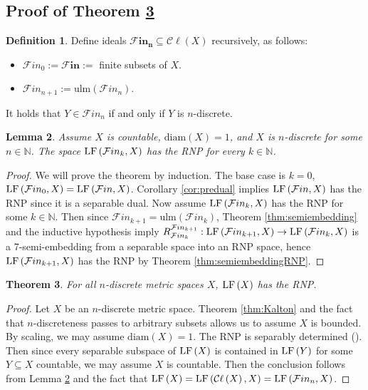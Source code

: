\documentclass[12pt]{amsart}
\newtheorem{theorem}{Theorem}[section]
\newtheorem{lemma}[theorem]{Lemma}
\theoremstyle{definition}
\newtheorem{definition}[theorem]{Definition}
\numberwithin{equation}{section}
\def \F {\mathcal{F}in}
\def \N {\mathbb{N}}
\def \sbs {\subseteq}
\newcommand{\Cl}[1]{\mathcal{C}\ell\left(#1\right)}
\newcommand{\diam}[1]{\mathrm{diam}\left( #1 \right)}
\newcommand{\ulm}[1]{\mathrm{ulm}\left(#1\right)}
\begin{document}
\subsection{Proof of Theorem \ref{thm:RNP}}
\begin{definition}
Define ideals $\boldsymbol{\F_n} \sbs \Cl{X}$ recursively, as follows:
\begin{itemize}
\item $\F_0 := \boldsymbol{\F} :=$ finite subsets of $X$.
\item $\F_{n+1} := \ulm{\F_n}$.
\end{itemize}
\end{definition}

It holds that $Y \in \F_n$ if and only if $Y$ is $n$-discrete.

\begin{lemma} \label{lem:RNP}
Assume $X$ is countable, $\diam{X} = 1$, and $X$ is $n$-discrete for some $n \in \N$. The space $\LF{\F_k}{X}$ has the RNP for every $k \in \N$.
\end{lemma}

\begin{proof}
We will prove the theorem by induction. The base case is $k=0$, $\LF{\F_0}{X} = \LF{\F}{X}$. Corollary \ref{cor:predual} implies $\LF{\F}{X}$ has the RNP since it is a separable dual. Now assume $\LF{\F_k}{X}$ has the RNP for some $k \in \N$. Then since $\F_{k+1} = \ulm{\F_k}$, Theorem \ref{thm:semiembedding} and the inductive hypothesis imply $R^{\F_{k+1}}_{\F_k}: \LF{\F_{k+1}}{X} \to \LF{\F_k}{X}$ is a 7-semi-embedding from a separable space into an RNP space, hence $\LF{\F_{k+1}}{X}$ has the RNP by Theorem \ref{thm:semiembeddingRNP}.
\end{proof}

\begin{theorem} \label{thm:RNP}
For all $n$-discrete metric spaces $X$, $\LF{X}$ has the RNP.
\end{theorem}

\begin{proof}
Let $X$ be an $n$-discrete metric space. Theorem \ref{thm:Kalton} and the fact that $n$-discreteness passes to arbitrary subsets allows us to assume $X$ is bounded. By scaling, we may assume $\diam{X} = 1$. The RNP is separably determined (\cite[Corollary 2.12]{P}). Then since every separable subspace of $\LF{X}$ is contained in $\LF{Y}$ for some $Y \sbs X$ countable, we may assume $X$ is countable. Then the conclusion follows from Lemma \ref{lem:RNP} and the fact that $\LF{X} = \LF{\Cl{X}}{X} = \LF{\F_n}{X}$.
\end{proof}
\end{document}
